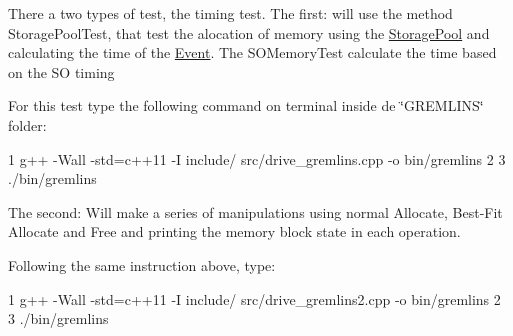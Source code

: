 There a two types of test, the timing test. The first\+: will use the method Storage\+Pool\+Test, that test the alocation of memory using the \hyperlink{class_storage_pool}{Storage\+Pool} and calculating the time of the \hyperlink{class_event}{Event}. The S\+O\+Memory\+Test calculate the time based on the SO timing
\begin{DoxyItemize}
\item For this test type the following command on terminal inside de \char`\"{}\+G\+R\+E\+M\+L\+I\+N\+S\char`\"{} folder\+: 
\begin{DoxyCode}
1 g++ -Wall -std=c++11 -I include/ src/drive\_gremlins.cpp -o bin/gremlins
2 
3 ./bin/gremlins
\end{DoxyCode}

\end{DoxyItemize}

The second\+: Will make a series of manipulations using normal Allocate, Best-\/\+Fit Allocate and Free and printing the memory block state in each operation.
\begin{DoxyItemize}
\item Following the same instruction above, type\+: 
\begin{DoxyCode}
1 g++ -Wall -std=c++11 -I include/ src/drive\_gremlins2.cpp -o bin/gremlins
2 
3 ./bin/gremlins
\end{DoxyCode}
 
\end{DoxyItemize}